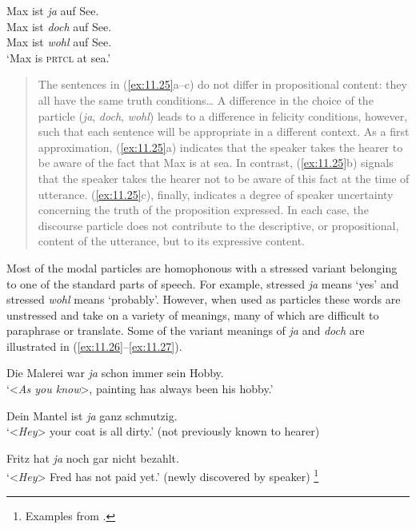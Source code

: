 \eanoraggedright \label{ex:11.25}
\ea  Max ist \textit{ja} auf See.\\
\ex Max ist \textit{doch} auf See.\\
\ex Max ist \textit{wohl} auf See.\\
‘Max is \textsc{prtcl} at sea.’
\z

\begin{quote}
The sentences in (\ref{ex:11.25}a–c) do not differ in propositional content: they all have the same truth conditions…  A difference in the choice of the particle (\textit{ja}, \textit{doch}, \textit{wohl}) leads to a difference in felicity conditions, however, such that each sentence will be appropriate in a different context. As a first approximation, (\ref{ex:11.25}a) indicates that the speaker takes the hearer to be aware of the fact that Max is at sea. In contrast, (\ref{ex:11.25}b) signals that the speaker takes the hearer not to be aware of this fact at the time of utterance. (\ref{ex:11.25}c), finally, indicates a degree of speaker uncertainty concerning the truth of the proposition expressed. In each case, the discourse particle does not contribute to the descriptive, or propositional, content of the utterance, but to its expressive content.
\end{quote}
\z


Most of the  modal particles are homophonous with a stressed variant belonging to one of the standard parts of speech. For example, stressed \textit{ja} means ‘yes’ and stressed \textit{wohl} means ‘probably’. However, when used as particles these words are unstressed and take on a variety of meanings, many of which are difficult to paraphrase or translate. Some of the variant meanings of \textit{ja} and \textit{doch} are illustrated in (\ref{ex:11.26}--\ref{ex:11.27}).


\ea \label{ex:11.26}
\ea  Die Malerei war \textit{ja} schon immer sein Hobby.\\
\glt ‘<\textit{As you know}>, painting has always been his hobby.’

\ex  Dein Mantel ist \textit{ja} ganz schmutzig.\\
\glt ‘<\textit{Hey}> your coat is all dirty.’ (not previously known to hearer)

\ex Fritz hat \textit{ja} noch gar nicht bezahlt.\\
\glt ‘<\textit{Hey}> Fred has not paid yet.’ (newly discovered by speaker)
\footnote{Examples from \citealt{König1991,KönigEtAl1990,Waltereit2001}.}
\z \z

